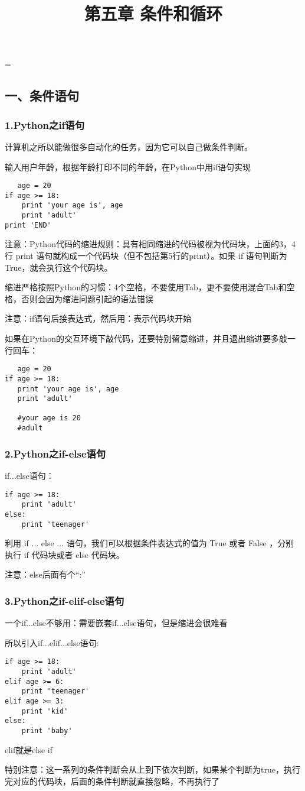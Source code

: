 \documentclass{article}
\begin{document}
 
\hfuzz=\maxdimen
{}
\begin{CJK}{UTF8}{gbsn}  
\title{第五章 条件和循环}
\author{}
\date{}
\maketitle
\part*{一、条件语句}
\section*{1.Python之if语句}
\subparagraph*{}
计算机之所以能做很多自动化的任务，因为它可以自己做条件判断。
\subparagraph*{}
输入用户年龄，根据年龄打印不同的年龄，在Python中用if语句实现
\begin{verbatim}
   age = 20
if age >= 18:
    print 'your age is', age
    print 'adult'
print 'END'
\end{verbatim}
\subparagraph*{}
注意：Python代码的缩进规则：具有相同缩进的代码被视为代码块，上面的3，4行 print 语句就构成一个代码块（但不包括第5行的print）。如果 if 语句判断为 True，就会执行这个代码块。
\subparagraph*{}
缩进严格按照Python的习惯：4个空格，不要使用Tab，更不要使用混合Tab和空格，否则会因为缩进问题引起的语法错误
\subparagraph*{}
注意：if语句后接表达式，然后用：表示代码块开始
\subparagraph*{}
如果在Python的交互环境下敲代码，还要特别留意缩进，并且退出缩进要多敲一行回车：
\begin{verbatim}
   age = 20
if age >= 18:
   print 'your age is', age
   print 'adult'
   
   #your age is 20
   #adult
\end{verbatim}
\section*{2.Python之if-else语句}
\subparagraph*{}
if...else语句：
\begin{verbatim}
if age >= 18:
    print 'adult'
else:
    print 'teenager'
\end{verbatim}
\subparagraph*{}
利用 if ... else ... 语句，我们可以根据条件表达式的值为 True 或者 False ，分别执行 if 代码块或者 else 代码块。
\subparagraph*{}
注意：else后面有个“:”
\section*{3.Python之if-elif-else语句}
\subparagraph*{}
一个if...else不够用：需要嵌套if...else语句，但是缩进会很难看
\subparagraph*{}
所以引入if...elif...else语句:
\begin{verbatim}
if age >= 18:
    print 'adult'
elif age >= 6:
    print 'teenager'
elif age >= 3:
    print 'kid'
else:
    print 'baby'
\end{verbatim}
\subparagraph*{}
elif就是else if
\subparagraph*{}
特别注意：这一系列的条件判断会从上到下依次判断，如果某个判断为true，执行完对应的代码块，后面的条件判断就直接忽略，不再执行了

\end{CJK}
\end{document}

